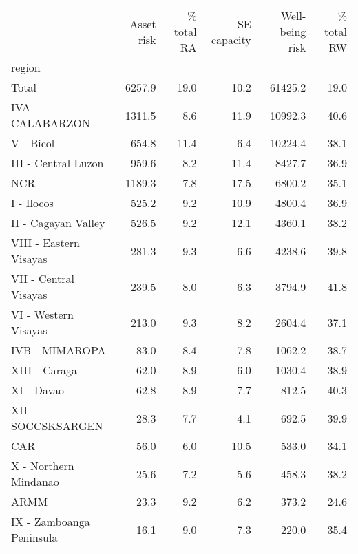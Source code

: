 \begin{tabular}{lrrrrr}
\toprule
{} &  Asset risk &  \% total RA &  SE capacity &  Well-being risk &  \% total RW \\
region                   &             &             &              &                  &             \\
\midrule
Total                    &      6257.9 &        19.0 &         10.2 &          61425.2 &        19.0 \\
IVA - CALABARZON         &      1311.5 &         8.6 &         11.9 &          10992.3 &        40.6 \\
V - Bicol                &       654.8 &        11.4 &          6.4 &          10224.4 &        38.1 \\
III - Central Luzon      &       959.6 &         8.2 &         11.4 &           8427.7 &        36.9 \\
NCR                      &      1189.3 &         7.8 &         17.5 &           6800.2 &        35.1 \\
I - Ilocos               &       525.2 &         9.2 &         10.9 &           4800.4 &        36.9 \\
II - Cagayan Valley      &       526.5 &         9.2 &         12.1 &           4360.1 &        38.2 \\
VIII - Eastern Visayas   &       281.3 &         9.3 &          6.6 &           4238.6 &        39.8 \\
VII - Central Visayas    &       239.5 &         8.0 &          6.3 &           3794.9 &        41.8 \\
VI - Western Visayas     &       213.0 &         9.3 &          8.2 &           2604.4 &        37.1 \\
IVB - MIMAROPA           &        83.0 &         8.4 &          7.8 &           1062.2 &        38.7 \\
XIII - Caraga            &        62.0 &         8.9 &          6.0 &           1030.4 &        38.9 \\
XI - Davao               &        62.8 &         8.9 &          7.7 &            812.5 &        40.3 \\
XII - SOCCSKSARGEN       &        28.3 &         7.7 &          4.1 &            692.5 &        39.9 \\
CAR                      &        56.0 &         6.0 &         10.5 &            533.0 &        34.1 \\
X - Northern Mindanao    &        25.6 &         7.2 &          5.6 &            458.3 &        38.2 \\
ARMM                     &        23.3 &         9.2 &          6.2 &            373.2 &        24.6 \\
IX - Zamboanga Peninsula &        16.1 &         9.0 &          7.3 &            220.0 &        35.4 \\
\bottomrule
\end{tabular}
